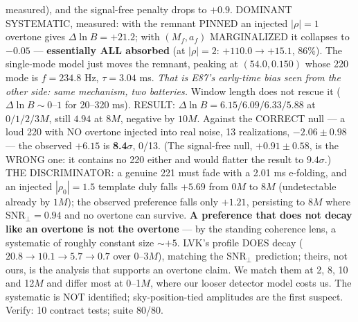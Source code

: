 \documentclass[10pt]{article}
\begin{document}
{measured), and the signal-free penalty drops to $+0.9$.
DOMINANT SYSTEMATIC, measured: with the remnant PINNED an injected $|\rho|=1$ overtone gives
$\Delta\ln B=+21.2$; with $(M_f,a_f)$ MARGINALIZED it collapses to $-0.05$ --- \textbf{essentially ALL
absorbed} (at $|\rho|=2$: $+110.0\to+15.1$, 86\%). The
single-mode model just moves the remnant, peaking at $(54.0,0.150)$ whose 220 mode is $f=234.8$ Hz,
$\tau=3.04$ ms. \emph{That is E87's early-time bias seen from the other side: same mechanism, two
batteries.} Window length does not rescue it ($\Delta\ln B\sim0$--$1$ for 20--320 ms). RESULT:
$\Delta\ln B = 6.15/6.09/6.33/5.88$ at $0/1/2/3M$, still $4.94$ at $8M$, negative by $10M$. Against the
CORRECT null --- a loud 220 with NO overtone injected into real noise, 13 realizations, $-2.06\pm0.98$ ---
the observed $+6.15$ is \textbf{8.4$\sigma$}, 0/13. (The signal-free null, $+0.91\pm0.58$, is the WRONG one:
it contains no 220 either and would flatter the result to $9.4\sigma$.) THE DISCRIMINATOR: a genuine 221
must fade with a 2.01 ms e-folding, and an injected $|\rho_0|=1.5$ template duly falls $+5.69$ from $0M$ to
$8M$ (undetectable already by $1M$); the observed preference falls only $\mathbf{+1.21}$, persisting to $8M$
where SNR$_\perp=0.94$ and no overtone can survive. \textbf{A preference that does not decay like an
overtone is not the overtone} --- by the standing coherence lens, a systematic of roughly constant size
${\sim}+5$. LVK's profile DOES decay ($20.8\to10.1\to5.7\to0.7$ over 0--3$M$), matching the SNR$_\perp$
prediction; theirs, not ours, is the analysis that supports an overtone claim. We match them at 2, 8, 10
and 12$M$ and differ most at 0--1$M$, where our looser detector model costs us. The systematic is NOT
identified; sky-position-tied amplitudes are the first suspect. Verify: 10 contract tests; suite 80/80.}
\end{document}
